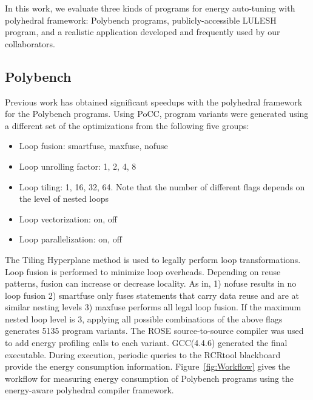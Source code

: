 In this work, we evaluate three kinds of programs for energy auto-tuning with
polyhedral framework: Polybench programs, publicly-accessible LULESH 
program\cite{LULESH:versions}, and a realistic application developed and frequently 
used by our collaborators.

\subsection{Polybench}
Previous work has obtained significant speedups with the 
polyhedral framework for the Polybench programs\cite{EJ2011,EJ2012,EJ2013}.
Using PoCC, program variants were generated using
a different set of the 
optimizations from the following five groups: 
\begin{itemize}
    \item Loop fusion: smartfuse, maxfuse, nofuse
    \item Loop unrolling factor: 1, 2, 4, 8
    \item Loop tiling: 1, 16, 32, 64. Note that the number of different flags
 depends on the level of nested loops   
    \item Loop vectorization: on, off
    \item Loop parallelization: on, off
\end{itemize}
The Tiling Hyperplane method\cite{Hyperplane} is used to legally perform loop transformations.
Loop fusion is performed to minimize loop overheads. Depending on reuse patterns, fusion can increase or decrease locality. As in\cite{EJ2013}, 1) nofuse results in no loop fusion 2) smartfuse only
fuses statements that carry data reuse and are at similar nesting levels 3) maxfuse performs all legal loop fusion.
If the maximum nested loop level is 3, applying all possible combinations
of the above flags generates 5135 program variants. The ROSE source-to-source
compiler was used to add energy profiling calls to each variant.
GCC(4.4.6) generated the final executable. During execution,
 periodic queries to the RCRtool blackboard provide the energy consumption information.
Figure~\ref{fig:Workflow} gives the workflow for measuring energy consumption of 
Polybench programs using the energy-aware polyhedral compiler framework.

